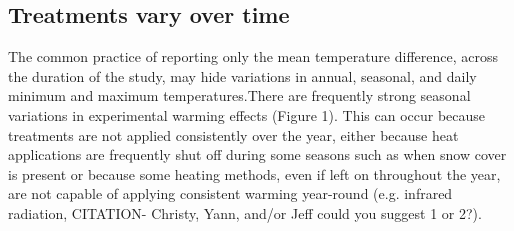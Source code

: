 \documentclass{article}
\begin{document}
\subsection* {Treatments vary over time}
The common practice of reporting only the mean temperature difference, across the duration of the study, may hide variations in annual, seasonal, and daily minimum and maximum temperatures.There are frequently strong seasonal variations in experimental warming effects (Figure 1). %
This can occur because treatments are not applied consistently over the year, either because heat applications are frequently shut off during some seasons such as when snow cover is present \citep[e.g.][]{clark2014a,clark2014b,hagedorn2010} or because some heating methods, even if left on throughout the year, are not capable of applying consistent warming year-round (e.g. infrared radiation, CITATION- Christy, Yann, and/or Jeff could you suggest 1 or 2?). %
\end{document}
